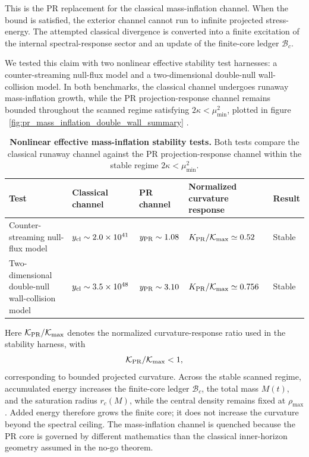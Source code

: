 \documentclass[11pt]{article}
\renewcommand{\arraystretch}{1.22}
\renewcommand{\arraystretch}{1.4}
\begin{document}
This is the PR replacement for the classical mass-inflation channel. When the 
bound is satisfied, the exterior channel cannot run to infinite projected 
stress-energy. The attempted classical divergence is converted into a finite 
excitation of the internal spectral-response sector and an update of the 
finite-core ledger \(\mathcal B_c\).

We tested this claim with two nonlinear effective stability test harnesses: a counter-streaming null-flux model and a two-dimensional double-null wall-collision model. In both benchmarks, the classical channel undergoes runaway mass-inflation growth, while the PR projection-response channel remains bounded throughout the scanned regime satisfying \(2\kappa<\mu_{\min}^2\), plotted in figure ~\ref{fig:pr_mass_inflation_double_wall_summary} .

\begin{table}[H]
\centering
\renewcommand{\arraystretch}{1.18}
\footnotesize
\caption{
\label{tab:mass_inflation_stability_tests}
\textbf{Nonlinear effective mass-inflation stability tests.}
Both tests compare the classical runaway channel against the PR projection-response channel within the stable regime \(2\kappa<\mu_{\min}^2\).
}
\begin{tabular}{@{} p{} p{} p{} p{} p{} @{}}
\toprule
\textbf{Test} &
\textbf{Classical channel} &
\textbf{PR channel} &
\textbf{Normalized curvature response} &
\textbf{Result} \\
\midrule
Counter-streaming null-flux model &
\(y_{\rm cl}\sim2.0\times10^{41}\) &
\(y_{\rm PR}\sim1.08\) &
\(K_{\rm PR}/\mathcal K_{\max}\simeq0.52\) &
Stable \\
\addlinespace
Two-dimensional double-null wall-collision model &
\(y_{\rm cl}\sim3.5\times10^{48}\) &
\(y_{\rm PR}\sim3.10\) &
\(K_{\rm PR}/\mathcal K_{\max}\simeq0.756\) &
Stable \\
\bottomrule
\end{tabular}
\captionsetup{font=footnotesize}
\end{table}

Here \(\mathcal K_{\rm PR}/\mathcal K_{\max}\) denotes the normalized 
curvature-response ratio used in the stability harness, with
\begin{equation}
\mathcal K_{\rm PR}/\mathcal K_{\max}<1, 
\end{equation}
corresponding to bounded projected 
curvature. Across the stable scanned regime, accumulated energy increases the 
finite-core ledger \(\mathcal B_c\), the total mass \(M(t)\), and the 
saturation radius \(r_c(M)\), while the central density remains fixed at 
\(\rho_{\max}\). Added energy therefore grows the finite core; it does not 
increase the curvature beyond the spectral ceiling. The mass-inflation channel 
is quenched because the PR core is governed by different mathematics than the 
classical inner-horizon geometry assumed in the no-go theorem.
\end{document}

